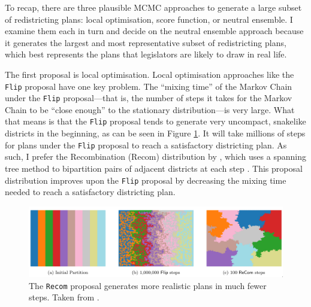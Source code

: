 \documentclass[]{article}
\begin{document}
To recap, there are three plausible MCMC approaches to generate a large
subset of redistricting plans: local optimisation, score function, or
neutral ensemble. I examine them each in turn and decide on the neutral
ensemble approach because it generates the largest and most
representative subset of redistricting plans, which best represents the
plans that legislators are likely to draw in real life.

The first proposal is local optimisation. Local optimisation approaches
like the \texttt{Flip} proposal have one key problem. The ``mixing
time'' of the Markov Chain under the \texttt{Flip} proposal---that is,
the number of steps it takes for the Markov Chain to be ``close enough''
to the stationary distribution---is very large. What that means is that
the \texttt{Flip} proposal tends to generate very uncompact, snakelike
districts in the beginning, as can be seen in Figure
\ref{recom_vs_flip}. It will take millions of steps for plans under the
\texttt{Flip} proposal to reach a satisfactory districting plan. As
such, I prefer the Recombination (Recom) distribution by
\citeauthor{ddj2019recom}, which uses a spanning tree method to
bipartition pairs of adjacent districts at each step
\citep{ddj2019comp}. This proposal distribution improves upon the
\texttt{Flip} proposal by decreasing the mixing time needed to reach a
satisfactory districting plan.

\begin{figure}
\centering
\includegraphics{img/recom_vs_flip.png}
\caption{\label{recom_vs_flip} The \texttt{Recom} proposal generates
more realistic plans in much fewer steps. Taken from
\cite{ddj2019recom}.}
\end{figure}
\end{document}
